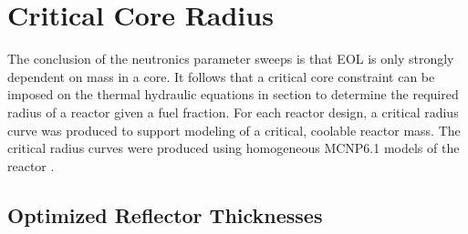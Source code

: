\section{Critical Core Radius}

The conclusion of the neutronics parameter sweeps is that EOL \keff is only
strongly dependent on \uran mass in a core. It follows that a critical core
constraint can be imposed on the thermal hydraulic equations in section to
determine the required radius of a reactor given a fuel fraction. For each
reactor design, a critical radius curve was produced to support modeling of a
critical, coolable reactor mass. The critical radius curves were produced using
homogeneous MCNP6.1 models of the reactor \citep{MCNP_citation}.

\subsection{Optimized Reflector Thicknesses}
